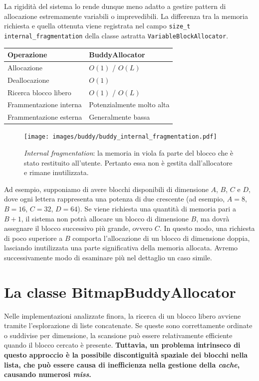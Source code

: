 La rigidità del sistema lo rende dunque meno adatto a gestire pattern di allocazione estremamente variabili o imprevedibili. La differenza tra la memoria richiesta e quella ottenuta viene registrata nel campo \texttt{size\_t internal\_fragmentation} della classe astratta \texttt{VariableBlockAllocator}.

\begin{center}
\begin{tabular}{|l|l|}
\hline
Operazione & BuddyAllocator \\
\hline
Allocazione & $O(1)$ / $O(L)$ \\
Deallocazione & $O(1)$ \\
Ricerca blocco libero & $O(1)$ / $O(L)$ \\
Frammentazione interna & Potenzialmente molto alta \\
Frammentazione esterna & Generalmente bassa \\
\hline
\end{tabular}
\end{center}

\begin{figure}[H]
    \centering
    \texttt{[image: images/buddy/buddy\_internal\_fragmentation.pdf]}
    \caption{\textit{Internal fragmentation}: la memoria in viola fa parte del blocco che è stato restituito all'utente. Pertanto essa non è gestita dall'allocatore e rimane inutilizzata.}
    \label{fig:buddy_internal_fragmentation}
\end{figure}

Ad esempio, supponiamo di avere blocchi disponibili di dimensione $A$, $B$, $C$ e $D$, dove ogni lettera rappresenta una potenza di due crescente (ad esempio, $A = 8$, $B = 16$, $C = 32$, $D = 64$). Se viene richiesta una quantità di memoria pari a $B+1$, il sistema non potrà allocare un blocco di dimensione $B$, ma dovrà assegnare il blocco successivo più grande, ovvero $C$. In questo modo, una richiesta di poco superiore a $B$ comporta l'allocazione di un blocco di dimensione doppia, lasciando inutilizzata una parte significativa della memoria allocata. Avremo successivamente modo di esaminare più nel dettaglio un caso simile.

\section{La classe BitmapBuddyAllocator}
Nelle implementazioni analizzate finora, la ricerca di un blocco libero avviene tramite l'esplorazione di liste concatenate. Se queste sono correttamente ordinate o suddivise per dimensione, la scansione può essere relativamente efficiente quando il blocco cercato è presente. \textbf{Tuttavia, un problema intrinseco di questo approccio è la possibile discontiguità spaziale dei blocchi nella lista, che può essere causa di inefficienza nella gestione della \textit{cache}, causando numerosi \textit{miss}.}

